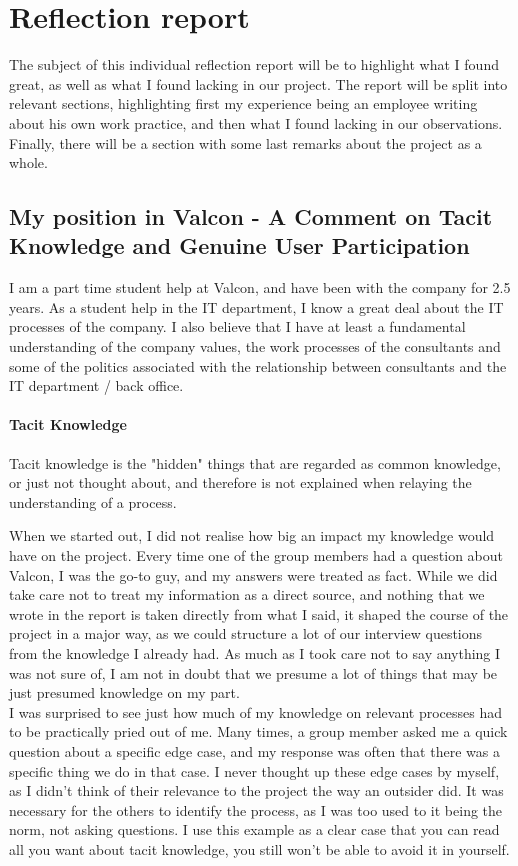 \chapter{Reflection report}

The subject of this individual reflection report will be to highlight what I found great, as well as what I found lacking in our project. The report will be split into relevant sections, highlighting first my experience being an employee writing about his own work practice, and then what I found lacking in our observations. Finally, there will be a section with some last remarks about the project as a whole.

\section{My position in Valcon - A Comment on Tacit Knowledge and Genuine User Participation}
I am a part time student help at Valcon, and have been with the company for 2.5 years. As a student help in the IT department, I know a great deal about the IT processes of the company. I also believe that I have at least a fundamental understanding of the company values, the work processes of the consultants and some of the politics associated with the relationship between consultants and the IT department / back office.

\subsubsection{Tacit Knowledge}
Tacit knowledge is the "hidden" things that are regarded as common knowledge, or just not thought about, and therefore is not explained when relaying the understanding of a process.

When we started out, I did not realise how big an impact my knowledge would have on the project. Every time one of the group members had a question about Valcon, I was the go-to guy, and my answers were treated as fact. While we did take care not to treat my information as a direct source, and nothing that we wrote in the report is taken directly from what I said, it shaped the course of the project in a major way, as we could structure a lot of our interview questions from the knowledge I already had.
As much as I took care not to say anything I was not sure of, I am not in doubt that we presume a lot of things that may be just presumed knowledge on my part. \\

I was surprised to see just how much of my knowledge on relevant processes had to be practically pried out of me. Many times, a group member asked me a quick question about a specific edge case, and my response was often that there was a specific thing we do in that case. I never thought up these edge cases by myself, as I didn't think of their relevance to the project the way an outsider did. It was necessary for the others to identify the process, as I was too used to it being the norm, not asking questions. I use this example as a clear case that you can read all you want about tacit knowledge, you still won't be able to avoid it in yourself.

